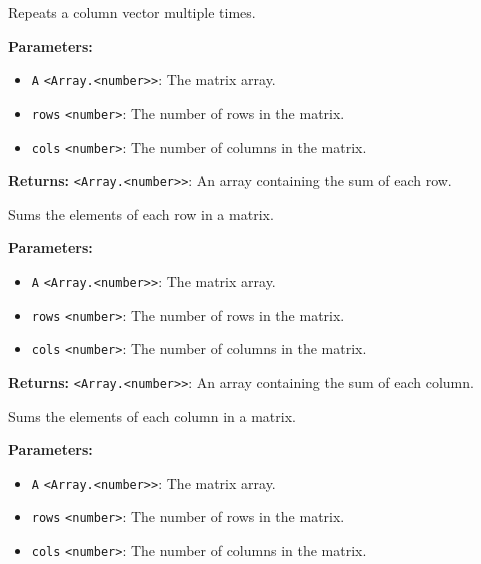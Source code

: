 \documentclass[12pt,a4paper]{article}
\begin{document}
\noindent Repeats a column vector multiple times.

\vspace{5mm}
\noindent {}


\noindent \textbf{Parameters:}
\begin{itemize}
  \item \texttt{A} \texttt{<Array.<number>>}: The matrix array.
  \item \texttt{rows} \texttt{<number>}: The number of rows in the matrix.
  \item \texttt{cols} \texttt{<number>}: The number of columns in the matrix.
\end{itemize}

\noindent \textbf{Returns:} \texttt{<Array.<number>>}: An array containing the sum of each row.

\noindent Sums the elements of each row in a matrix.

\vspace{5mm}
\noindent {}


\noindent \textbf{Parameters:}
\begin{itemize}
  \item \texttt{A} \texttt{<Array.<number>>}: The matrix array.
  \item \texttt{rows} \texttt{<number>}: The number of rows in the matrix.
  \item \texttt{cols} \texttt{<number>}: The number of columns in the matrix.
\end{itemize}

\noindent \textbf{Returns:} \texttt{<Array.<number>>}: An array containing the sum of each column.

\noindent Sums the elements of each column in a matrix.

\vspace{5mm}
\noindent {}


\noindent \textbf{Parameters:}
\begin{itemize}
  \item \texttt{A} \texttt{<Array.<number>>}: The matrix array.
  \item \texttt{rows} \texttt{<number>}: The number of rows in the matrix.
  \item \texttt{cols} \texttt{<number>}: The number of columns in the matrix.
\end{itemize}
\end{document}
